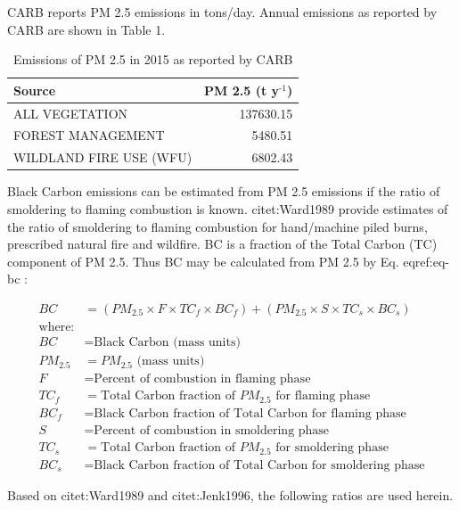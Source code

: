 \documentclass[a4paper]{article}
\begin{document}
CARB reports PM 2.5 emissions in tons/day. Annual emissions as
reported by CARB are shown in Table 1.

\begin{table}[htb]
\caption{Emissions of PM 2.5 in 2015 as reported by CARB}
\centering
\begin{tabular}{lr}
Source & PM 2.5 (t y$^{\text{-1}}$)\\
\hline
ALL VEGETATION & 137630.15\\
FOREST MANAGEMENT & 5480.51\\
WILDLAND FIRE USE (WFU) & 6802.43\\
\end{tabular}
\end{table}


Black Carbon emissions
can be estimated from PM 2.5 emissions if the ratio of smoldering to
flaming combustion is known. citet:Ward1989 provide estimates of
the ratio of smoldering to flaming combustion for hand/machine piled
burns, prescribed natural fire and wildfire. BC is a fraction
of the Total Carbon (TC) component of PM 2.5. Thus BC may be calculated from PM
2.5 by Eq. eqref:eq-bc :



\begin{align}
BC &= \left( PM_{2.5} \times F \times TC_f \times BC_f\right) + \left( PM_{2.5} \times S \times TC_s \times BC_s\right) \label{eq-bc} \\
\text{where:} \nonumber \\
BC &= \text{Black Carbon (mass units)} \nonumber \\
PM_{2.5} &= PM_{2.5} \text{ (mass units)} \nonumber \\
F &= \text{Percent of combustion in flaming phase} \nonumber \\
TC_f &= \text{Total Carbon fraction of } PM_{2.5} \text{ for flaming phase} \nonumber \\
BC_f &= \text{Black Carbon fraction of Total Carbon for flaming phase} \nonumber \\
S &= \text{Percent of combustion in smoldering phase} \nonumber \\
TC_s &= \text{Total Carbon fraction of } PM_{2.5} \text{ for smoldering phase} \nonumber \\
BC_s &= \text{Black Carbon fraction of Total Carbon for smoldering phase} \nonumber
\end{align}


Based on citet:Ward1989 and citet:Jenk1996, the following ratios are
used herein.
\end{document}
